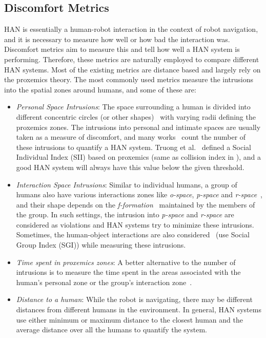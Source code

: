 \subsection{Discomfort Metrics}
HAN is essentially a human-robot interaction in the context of robot navigation, and it is necessary to measure how well or how bad the interaction was. Discomfort metrics aim to measure this and tell how well a HAN system is performing. Therefore, these metrics are naturally employed to compare different HAN systems. Most of the existing metrics are distance based and largely rely on the proxemics theory. The most commonly used metrics measure the intrusions into the spatial zones around humans, and some of these are:
\begin{itemize}
    \item \textit{Personal Space Intrusions}: The space surrounding a human is divided into different concentric circles (or other shapes)~\cite{rios2015proxemics} with varying radii defining the proxemics zones. The intrusions into personal and intimate spaces are usually taken as a measure of discomfort, and many works~\cite{okal2016learning, perez2018teaching} count the number of these intrusions to quantify a HAN system. Truong et al.~\cite{truong2017toward} defined a Social Individual Index (SII) based on proxemics (same as collision index in \cite{truong2014dynamic}), and a good HAN system will always have this value below the given threshold. 
    \item \textit{Interaction Space Intrusions}: Similar to individual humans, a group of humans also have various interactions zones like \textit{o-space}, \textit{p-space} and \textit{r-space}~\cite{ferrer2017robot, rios2015proxemics}, and their shape depends on the \textit{f-formation}~\cite{kendon2010spacing} maintained by the members of the group. In such settings, the intrusion into \textit{p-space} and \textit{r-space} are considered as violations and HAN systems try to minimize these intrusions. Sometimes, the human-object interactions are also considered~\cite{truong2017toward} (use Social Group Index (SGI)) while measuring these intrusions.
    \item \textit{Time spent in proxemics zones}: A better alternative to the number of intrusions is to measure the time spent in the areas associated with the human's personal zone or the group's interaction zone~\cite{kostavelis2017robot}.  
    \item \textit{Distance to a human}: While the robot is navigating, there may be different distances from different humans in the environment. In general, HAN systems use either minimum or maximum distance to the closest human and the average distance over all the humans to quantify the system.
\end{itemize}

